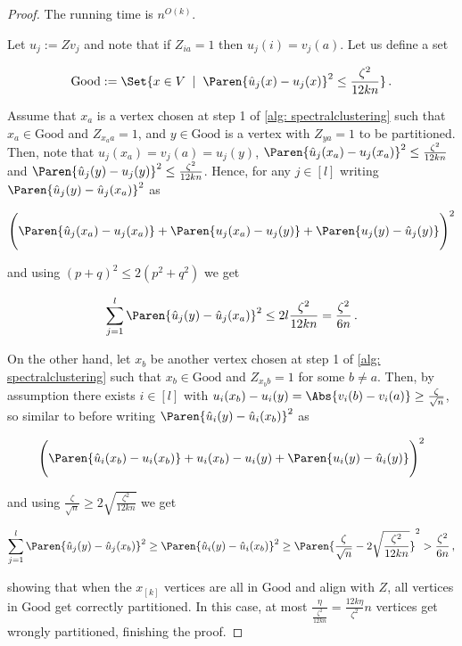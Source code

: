 \begin{proof}
    The running time is $n^{O(k)}$.
    
    Let $u_j:=Zv_j$ and note that if $Z_{ia}=1$ then $u_j(i)=v_j(a)$. Let us define a set
    
    $$\mathrm{Good}:=\Set{x\in V\;\mid\; \Paren{\hat{u}_j(x)-u_j(x)}^2\leq \frac{\zeta^2}{12kn}}\,.$$
    
    Assume that $x_a$ is a vertex chosen at step 1 of \cref{alg: spectralclustering} such that $x_a\in\mathrm{Good}$ and $Z_{x_a a}=1$, and $y\in\mathrm{Good}$ is a vertex with $Z_{ya}=1$ to be partitioned. Then, note that $u_j(x_a)=v_j(a)=u_j(y)$, $\Paren{\hat{u}_j(x_a)-u_j(x_a)}^2\leq \frac{\zeta^2}{12kn}$ and $\Paren{\hat{u}_j(y)-u_j(y)}^2\leq \frac{\zeta^2}{12kn}$. Hence, for any $j\in[l]$ writing $\Paren{\hat{u}_j(y)-\hat{u}_j(x_a)}^2$ as
    
    $$\Bigg(\Paren{\hat{u}_j(x_a)-u_j(x_a)}+\Paren{u_j(x_a)-u_j(y)}+\Paren{u_j(y)-\hat{u}_j(y)}\Bigg)^2$$
    
    and using $(p+q)^2\leq 2(p^2+q^2)$ we get

    $$\sum_{j=1}^l \Paren{\hat{u}_j(y)-\hat{u}_j(x_a)}^2\leq 2l \frac{\zeta^2}{12kn}=\frac{\zeta^2}{6n}\,.$$

    On the other hand, let $x_b$ be another vertex chosen at step 1 of \cref{alg: spectralclustering} such that $x_b\in\mathrm{Good}$ and $Z_{x_b b}=1$ for some $b\neq a$. Then, by assumption there exists $i\in[l]$ with $u_i(x_b)-u_i(y)=\Abs{v_i(b)-v_i(a)}\geq \frac{\zeta}{\sqrt{n}}$, so similar to before writing $\Paren{\hat{u}_i(y)-\hat{u}_i(x_b)}^2$ as
    
    $$\Bigg(\Paren{\hat{u}_i(x_b)-u_i(x_b)}+u_i(x_b)-u_i(y)+\Paren{u_i(y)-\hat{u}_i(y)}\Bigg)^2$$

    and using $\frac{\zeta}{\sqrt{n}}\geq 2\sqrt{\frac{\zeta^2}{12kn}}$ we get

    $$\sum_{j=1}^l \Paren{\hat{u}_j(y)-\hat{u}_j(x_b)}^2\geq \Paren{\hat{u}_i(y)-\hat{u}_i(x_b)}^2 \geq \Paren{\frac{\zeta}{\sqrt{n}}-2\sqrt{\frac{\zeta^2}{12kn}}}^2>\frac{\zeta^2}{6n}\, ,$$


    showing that when the $x_{[k]}$ vertices are all in $\mathrm{Good}$ and align with $Z$, all vertices in $\mathrm{Good}$ get correctly partitioned. In this case, at most $\frac{\eta}{\frac{\zeta^2}{12kn}}=\frac{12k\eta}{\zeta^2}n$ vertices get wrongly partitioned, finishing the proof.
\end{proof}

